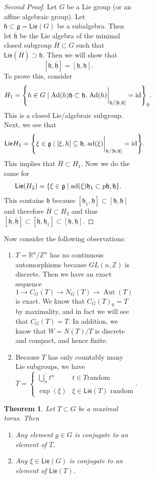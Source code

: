 \documentclass[leqno, openany]{memoir}
\newtheorem{thm}{Theorem}[section]
\theoremstyle{definition}
\theoremstyle{remark}
\theoremstyle{plain}
\theoremstyle{definition}
\theoremstyle{remark}
\newcommand{\R}{\mathbb{R}}
\newcommand{\Z}{\mathbb{Z}}
\newcommand{\mf}[1]{\mathfrak{#1}}
\newcommand{\mr}[1]{\mathrm{#1}}
\newcommand{\ms}[1]{\mathsf{#1}}
\newcommand{\ol}[1]{\overline{#1}}
\DeclareMathOperator{\ad}{ad}
\DeclareMathOperator{\Ad}{Ad}
\DeclareMathOperator{\Aut}{Aut}
\begin{document}
\begin{figure}[H]
\begin{figure}[H]
\begin{figure}[H]
\begin{proof}[Second Proof] Let $G$ be a Lie group (or an affine algebraic
    group). Let $\mf{h} \subset \mf{g} = \ms{Lie}(G)$ be a subalgebra. Then let
    $\ol{\mf{h}}$ be the Lie algebra of the minimal closed subgroup $\ol{H}
    \subset G$ such that $\ms{Lie}(\ol{H}) \supset \mf{h}$. Then we will show
    that \[ [\ol{\mf{h}}, \ol{\mf{h}}] = [\mf{h}, \mf{h}]. \] To prove this,
    consider \[ H_1 = \qty{ h \in G \mid \Ad(h) \mf{h} \subset \mf{h},
    \eval{\Ad(h)}_{\mf{h}/[\mf{h}, \mf{h}]} = \mr{id} }_0. \] This is a closed
    Lie/algebraic subgroup. Next, we see that \[ \ms{Lie} H_1 = \qty{\xi \in
    \mf{g} \mid [\xi, h] \subseteq \mf{h}, \eval{\ad(\xi)}_{\mf{h} / [\mf{h},
    \mf{h}]} = \mr{id} }. \] This implies that $\ol{H} \subset H_1$. Now we do
    the same for \[ \ms{Lie} (H_2) = \qty{\xi \in \mf{g} \mid \ad(\xi) \mf{h}_1
    \subset p\mf{h, \mf{h}}}. \] This contains $\mf{h}$ because $[\mf{h}_1,
    \mf{h}] \subset [\mf{h}, \mf{h}]$ and therefore $\ol{H} \subset H_2$ and
    thus $[\ol{\mf{h}}, \ol{\mf{h}}] \subset [\ol{\mf{h}}, \mf{h}_1] \subset
    [\mf{h}, \mf{h}]$.  \end{proof}

Now consider the following observations: \begin{enumerate} \item $T = \R^n /
    \Z^n$ has no continuous automorphisms because $GL(n, \Z)$ is discrete. Then
    we have an exact sequence \[ 1 \to C_G(T) \to N_G(T) \to \Aut(T) \] is
    exact. We know that $C_G(T)_0 = T$ by maximality, and in fact we will see
    that $C_G(T) = T$. In addition, we know that $W = N(T)/T$ is discrete and
    compact, and hence finite.  \item Because $T$ has only countably many Lie
subgroups, we have \[ T = \begin{cases} \ol{\bigcup_n t^n} & t \in T \text{
random} \\ \ol{\exp (\xi)} & \xi \in \ms{Lie}(T) \text{ random} \end{cases}. \]
\end{enumerate}

\begin{thm} Let $T \subset G$ be a maximal torus. Then \begin{enumerate} \item
Any element $g \in G$ is conjugate to an element of $T$.  \item Any $\xi \in
\ms{Lie}(G)$ is conjugate to an element of $\ms{Lie}(T)$.  \end{enumerate}
\end{thm}


\end{figure}
\end{figure}
\end{figure}
\end{document}
